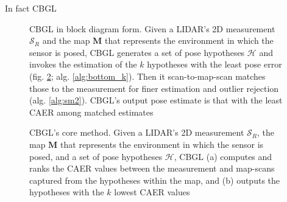 In fact CBGL





\begin{figure}[]\centering
  
  \caption{\small CBGL in block diagram form. Given a LIDAR's 2D measurement
           $\mathcal{S}_R$ and the map $\bm{M}$ that represents the environment
           in which the sensor is posed, CBGL generates a set of pose hypotheses
           $\mathcal{H}$ and invokes the estimation of the $k$ hypotheses with
           the least pose error (fig. \ref{fig:bottom_k}; alg.
           \ref{alg:bottom_k}). Then it scan-to-map-scan matches those to the
           measurement for finer estimation and outlier rejection (alg.
           \ref{alg:sm2}). CBGL's output pose estimate is that with the least
           CAER among matched estimates}
  \label{fig:cbgl}
\end{figure}

\begin{figure}[]\centering
  
  \caption{\small CBGL's core method. Given a LIDAR's 2D measurement
           $\mathcal{S}_R$, the map $\bm{M}$ that represents the environment in
           which the sensor is posed, and a set of pose hypotheses
           $\mathcal{H}$, CBGL (a) computes and ranks the CAER values between
           the measurement and map-scans captured from the hypotheses within
           the map, and (b) outputs the hypotheses with the $k$ lowest CAER
           values}
  \label{fig:bottom_k}
\end{figure}





